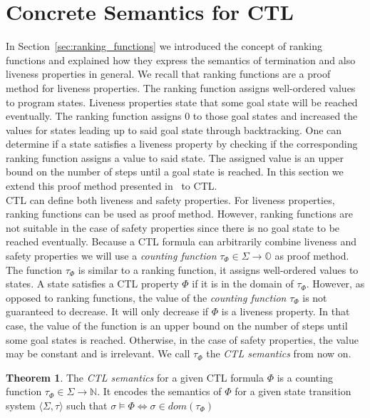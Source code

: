 \documentclass[11pt,a4paper,titlepage]{article}
\theoremstyle{definition}
\newtheorem{theorem}{Theorem}[section]
\begin{document}
\section{Concrete Semantics for CTL}\label{sec:ctl_semantics}

In Section~\ref{sec:ranking_functions} we introduced the concept of ranking functions and explained how they express the semantics of 
termination and also liveness properties in general. We recall that ranking functions are a proof method for liveness properties. 
The ranking function assigns well-ordered values to program states. 
Liveness properties state that some goal state will be reached eventually. The ranking function assigns $0$ to those goal states 
and increased the values for states leading up to said goal state through backtracking.
One can determine if a state satisfies a liveness property by checking if the corresponding ranking function
assigns a value to said state. The assigned value is an upper bound on the number of steps until a goal state is reached.
In this section we extend this proof method presented in~\cite{UrbanPhd} to CTL.\\

CTL can define both liveness and safety properties. For liveness properties, ranking functions can be used as proof method. 
However, ranking functions are not suitable in the case of safety properties since there is no goal state to be reached eventually. 
Because a CTL formula can arbitrarily combine liveness and safety properties we will use a \textit{counting function} 
$\tau_\Phi \in \Sigma \rightarrow \mathbb{O}$ as proof method. 
The function $\tau_\Phi$ is similar to a ranking function, it assigns well-ordered values to states. 
A state satisfies a CTL property $\Phi$ if it is in the domain of $\tau_\Phi$. 
However, as opposed to ranking functions, the value of the \textit{counting function} $\tau_\Phi$ is not guaranteed to 
decrease. It will only decrease if $\Phi$ is a liveness property. 
In that case, the value of the function is an upper bound on the number of steps until some goal states is reached. 
Otherwise, in the case of safety properties, the value may be constant and is irrelevant. 
We call $\tau_\Phi$ the \textit{CTL semantics} from now on.

\begin{theorem}\label{thr:ctl_semantics}
    The \textit{CTL semantics} for a given CTL formula $\Phi$ is a counting function 
    $\tau_{\Phi} \in \Sigma \rightarrow \mathbb{N}$. 
    It encodes the semantics of $\Phi$ for a given state transition 
    system $\langle \Sigma, \tau \rangle$ such that 
    $\sigma \models \Phi \iff \sigma \in dom(\tau_{\Phi})$
\end{theorem}
\end{document}
